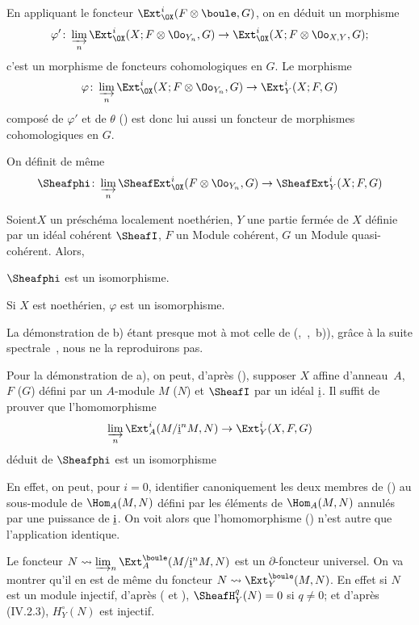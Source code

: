 En appliquant le foncteur $\Ext_{\OX}^i(F\otimes\boule, G)$, on en d\'eduit un morphisme
$$
\varphi'\colon \varinjlim_{n} \Ext_{\OX}^i(X;F\otimes \Oo_{Y_n}, G) \to \Ext_{\OX}^i(X;F \otimes \Oo_{X, Y}, G);
$$
c'est un morphisme de foncteurs cohomologiques en $G$. Le morphisme
$$
\varphi\colon \varinjlim_{n} \Ext_{\OX}^i(X;F\otimes \Oo_{Y_n}, G) \to \Ext_Y^i(X;F, G)
$$
compos\'e de $\varphi'$ et de $\theta$ (\cf {}) est donc lui aussi un foncteur de morphismes cohomologiques en $G$.

On d\'efinit de m\^eme
$$
\Sheafphi\colon \varinjlim_n \SheafExt_{\OX}^i(F \otimes \Oo_{Y_n}, G) \to \SheafExt_Y^i(X;F, G)
$$

\begin{theoreme} \label{VI.2.3}
Soient\pageoriginale $X$ un pr\'esch\'ema localement noeth\'erien, $Y$ une partie ferm\'ee de $X$ d\'efinie par un id\'eal coh\'erent $\SheafI$, $F$ un Module coh\'erent, $G$ un Module quasi-coh\'erent. Alors,
\begin{enumeratea}
\item
$\Sheafphi$ est un isomorphisme.
\item
Si $X$ est noeth\'erien, $\varphi$ est un isomorphisme.
\end{enumeratea}
\end{theoreme}

La d\'emonstration de b) \'etant presque mot \`a mot celle de (,~,~b)), gr\^ace \`a la suite spectrale~, nous ne la reproduirons pas.

Pour la d\'emonstration de a), on peut, d'apr\`es (), supposer $X$ affine d'anneau~$A$, $F$ (\resp $G$) d\'efini par un $A$-module $M$ (\resp $N$) et $\SheafI$ par un id\'eal $\underline{\rm{i}}$. Il suffit de prouver que l'homomorphisme
\begin{equation} \label{VI.2.3.1} \varinjlim_{{n}} \Ext_A^i(M/\underline{\rm{i}}^nM, N) \to \Ext_Y^i(X, F, G)
\end{equation}
d\'eduit de $\Sheafphi$ est un isomorphisme

En effet, on peut, pour $i=0$, identifier canoniquement les deux membres de () au sous-module de $\Hom_A(M, N)$ d\'efini par les \'el\'ements de $\Hom_A(M, N)$ annul\'es par une puissance de $\underline{\rm{i}}$. On voit alors que l'homomorphisme () n'est autre que l'application identique.

Le foncteur $N\rightsquigarrow \varinjlim_{n} \Ext_A^\boule(M/\underline{\rm{i}}^nM, N)$ est un $\partial$-foncteur universel. On va montrer qu'il en est de m\^eme du foncteur $N \rightsquigarrow \Ext_Y^\boule(M, N)$. En effet si $N$ est un module injectif, d'apr\`es ( et ), $\SheafH_Y^q(N)=0$ si $q \neq 0$; et d'apr\`es (IV.2.3), $H_Y^{\circ}(N)$ est injectif.

